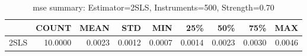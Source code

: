 \begin{table}[ht]
\centering
\caption{mse summary: Estimator=2SLS, Instruments=500, Strength=0.70}
\begin{tabular}{lrrrrrrrr}
\toprule
 & COUNT & MEAN & STD & MIN & 25\% & 50\% & 75\% & MAX \\
\midrule
2SLS & 10.0000 & 0.0023 & 0.0012 & 0.0007 & 0.0014 & 0.0023 & 0.0030 & 0.0046 \\
\bottomrule
\end{tabular}
\end{table}
